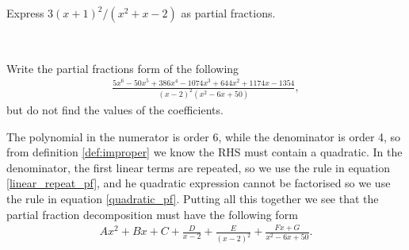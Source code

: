 \begin{example}
    Express $3(x+1)^2/(x^2+x-2)$ as partial fractions.
\end{example}
\\

\begin{example}
    Write the partial fractions form of the following
    \begin{align*}
        \frac{5x^6 - 50x^5 + 386x^4 - 1074x^3 + 644x^2 + 1174x - 1354}{(x-2)^2(x^2-6x+50)},
    \end{align*}
    but do not find the values of the coefficients.
\begin{solution}
The polynomial in the numerator is order 6, while the denominator is order 4, so from definition \ref{def:improper} we know the RHS must contain a quadratic. In the denominator, the first linear terms are repeated, so we use the rule in equation \ref{linear_repeat_pf}, and he quadratic expression cannot be factorised so we use the rule in equation \ref{quadratic_pf}. Putting all this together we see that the partial fraction decomposition must have the following form
\begin{align*}
    Ax^2 + Bx + C + \frac{D}{x-2} + \frac{E}{(x-2)^2} + \frac{Fx+G}{x^2-6x+50}.
\end{align*}
\end{solution}
\end{example}



